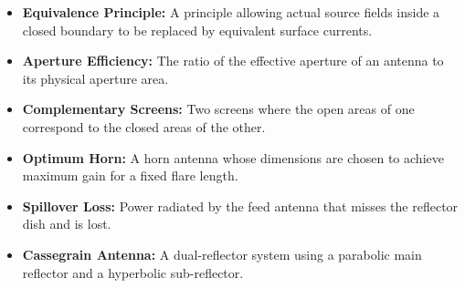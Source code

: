 \documentclass[12pt,a4paper]{article}
\begin{document}
\begin{tcolorbox}[defbox, title={\textbf{One-Line Definitions}}]
\begin{itemize}[leftmargin=*, itemsep=2pt, topsep=0pt]
  \item \textbf{Equivalence Principle:} A principle allowing actual source fields inside a closed boundary to be replaced by equivalent surface currents.
  \item \textbf{Aperture Efficiency:} The ratio of the effective aperture of an antenna to its physical aperture area.
  \item \textbf{Complementary Screens:} Two screens where the open areas of one correspond to the closed areas of the other.
  \item \textbf{Optimum Horn:} A horn antenna whose dimensions are chosen to achieve maximum gain for a fixed flare length.
  \item \textbf{Spillover Loss:} Power radiated by the feed antenna that misses the reflector dish and is lost.
  \item \textbf{Cassegrain Antenna:} A dual-reflector system using a parabolic main reflector and a hyperbolic sub-reflector.
\end{itemize}
\end{tcolorbox}
\end{document}

